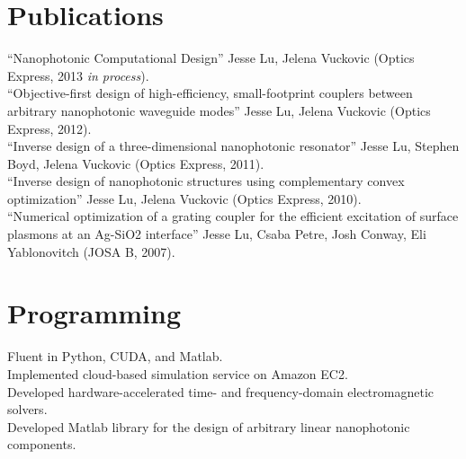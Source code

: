 \documentclass{res}
\begin{document}
\begin{resume}
\section{Publications}          
    ``Nanophotonic Computational Design'' Jesse Lu, Jelena Vuckovic (Optics Express, 2013 \emph{in process}). \\
    ``Objective-first design of high-efficiency, small-footprint couplers between arbitrary nanophotonic waveguide modes'' Jesse Lu, Jelena Vuckovic (Optics Express, 2012). \\
    ``Inverse design of a three-dimensional nanophotonic resonator'' Jesse Lu, Stephen Boyd, Jelena Vuckovic (Optics Express, 2011). \\
    ``Inverse design of nanophotonic structures using complementary convex optimization'' Jesse Lu, Jelena Vuckovic (Optics Express, 2010). \\
    ``Numerical optimization of a grating coupler for the efficient excitation of surface plasmons at an Ag-SiO2 interface'' Jesse Lu, Csaba Petre, Josh Conway, Eli Yablonovitch (JOSA B, 2007).
  
\section{Programming}          
    Fluent in Python, CUDA, and Matlab. \\
    Implemented cloud-based simulation service on Amazon EC2. \\
    Developed hardware-accelerated time- and frequency-domain
        electromagnetic solvers. \\
    Developed Matlab library for the design of arbitrary linear nanophotonic components.


\end{resume}
\end{document}
